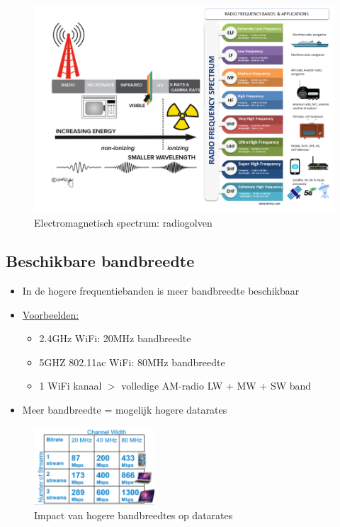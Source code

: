 \documentclass{article}
\begin{document}
\begin{figure}[H]
    \centering
    \includegraphics[width=\textwidth]{Screenshot_20200309_115132.png}
    \caption{Electromagnetisch spectrum: radiogolven}
\end{figure}

\subsection{Beschikbare bandbreedte}
\begin{itemize}
    \item In de hogere frequentiebanden is meer bandbreedte beschikbaar
    \item \underline{Voorbeelden:}
    \begin{itemize}
        \item 2.4GHz WiFi: 20MHz bandbreedte
        \item 5GHZ 802.11ac WiFi: 80MHz bandbreedte
        \item 1 WiFi kanaal $>$ volledige AM-radio LW + MW + SW band
    \end{itemize}
    \item Meer bandbreedte = mogelijk hogere datarates
\end{itemize}

\begin{figure}[H]
    \centering
    \includegraphics[width=0.4\textwidth]{Screenshot_20200315_160828.png}
    \caption{Impact van hogere bandbreedtes op datarates}
\end{figure}
\end{document}

